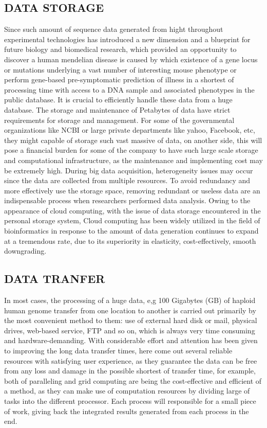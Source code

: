 \documentclass[12pt]{article}
\begin{document}
\subsection{DATA STORAGE}
Since such amount of sequence data generated from hight throughout experimental technologies has introduced a new dimension and a blueprint for future biology and biomedical research, which provided an opportunity to discover a human mendelian disease is caused by which existence of a gene locus or mutations underlying a vast number of interesting mouse phenotype or perform gene-based pre-symptomatic prediction of illness in a shortest of processing time with access to a DNA sample and associated phenotypes in the public database. It is crucial to efficiently handle these data from a huge database. The storage and maintenance of Petabytes of data have strict requirements for storage and management. For some of the governmental organizations like NCBI or large private departments like yahoo, Facebook, etc, they might capable of storage such vast massive of data, on another side, this will pose a financial burden for some of the company to have such large scale storage and computational infrastructure, as the maintenance and implementing cost may be extremely high. During big data acquisition, heterogeneity issues may occur since the data are collected from multiple resources. To avoid redundancy and more effectively use the storage space, removing redundant or useless data are an indispensable process when researchers performed data analysis. Owing to the appearance of cloud computing, with the issue of data storage encountered in the personal storage system, Cloud computing has been widely utilized in the field of bioinformatics in response to the amount of data generation continues to expand at a tremendous rate, due to its superiority in elasticity, cost-effectively, smooth downgrading. 

\subsection{DATA TRANFER}
In most cases, the processing of a huge data, e,g 100 Gigabytes (GB) of haploid human genome transfer from one location to another is carried out primarily by the most convenient method to them: use of external hard disk or mail, physical drives, web-based service, FTP and so on, which is always very time consuming and hardware-demanding. With considerable effort and attention has been given to improving the long data transfer times, here come out several reliable resources with satisfying user experience, as they guarantee the data can be free from any loss and damage in the possible shortest of transfer time, for example, both of paralleling and grid computing are being the cost-effective and efficient of a method, as they can make use of computation resources by dividing large of tasks into the different processor. Each process will responsible for a small piece of work, giving back the integrated results generated from each process in the end.
\end{document}
